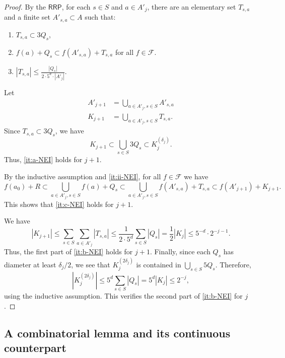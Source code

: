 \documentclass[12pt]{amsart}
\newcommand{\RRP}{\mathsf{RRP}}
\numberwithin{theorem}{section}
\numberwithin{equation}{section}
\begin{document}
\begin{proof}
    By the $\RRP$, for each $s\in S$ and $a\in A'_j$, there are an elementary set $T_{s,a}$ and a finite set $A'_{s,a}\subset A$ such that:
    \begin{enumerate}[label=(\Alph*)]
        \item \label{it:i-NEI} $T_{s,a}\subset 3 Q_s$,
        \item \label{it:ii-NEI} $f(a)+Q_s\subset f(A'_{s,a})+T_{s,a}$ for all $f\in\mathcal{F}$.
        \item \label{it:iii-NEI} $\displaystyle{|T_{s,a}|\le \frac{|Q_s|}{2\cdot 5^d\cdot |A'_j|}}$.
    \end{enumerate}

    Let
    \begin{align*}
        A'_{j+1} &= \bigcup_{a\in A'_j, s\in S} A'_{s,a}\\
        K_{j+1} &=\bigcup_{a\in A'_j, s\in S} T_{s,a}.
    \end{align*}
    Since $T_{s,a}\subset 3 Q_s$, we have
    \[
    K_{j+1}\subset \bigcup_{s\in S} 3 Q_s \subset K_j^{(\delta_j)}.
    \]
    Thus, \ref{it:a-NEI} holds for $j+1$.

    By the inductive assumption and \ref{it:ii-NEI}, for all $f\in\mathcal{F}$ we have
    \[
       f(a_0) + R \subset \bigcup_{a\in A'_{j}, s\in S} f(a)+Q_s \subset  \bigcup_{a\in A'_{j}, s\in S} f(A'_{s,a})+T_{s,a} \subset f(A'_{j+1})+K_{j+1}.
    \]
    This shows that \ref{it:c-NEI} holds for $j+1$.

    We have
    \[
        |K_{j+1}| \le \sum_{s\in S}\sum_{a\in A'_j} |T_{s,a}| \le \frac{1}{2\cdot 5^d} \sum_{s\in S} |Q_s| = \frac{1}{2}|K_j|\le 5^{-d}\cdot 2^{-j-1}.
    \]
    Thus, the first part of \ref{it:b-NEI} holds for $j+1$. Finally, since each $Q_s$ has diameter at least $\delta_j/2$, we see that  $K_{j}^{(2\delta_j)}$ is contained in $\bigcup_{s\in S} 5 Q_s$. Therefore,
    \[
    \left|K_{j}^{(2\delta_j)}\right| \le 5^d\sum_{s\in S}|Q_s| = 5^d |K_{j}| \le 2^{-j},
    \]
    using the inductive assumption. This verifies the second part of \ref{it:b-NEI} for $j$.
\end{proof}


\subsection{A combinatorial lemma and its continuous counterpart}
\end{document}
